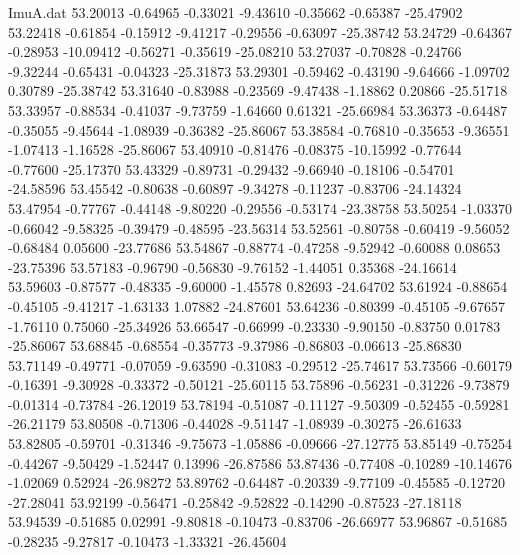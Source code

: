 \begin{filecontents}{ImuA.dat}
  53.20013   -0.64965   -0.33021   -9.43610   -0.35662   -0.65387  -25.47902
  53.22418   -0.61854   -0.15912   -9.41217   -0.29556   -0.63097  -25.38742
  53.24729   -0.64367   -0.28953  -10.09412   -0.56271   -0.35619  -25.08210
  53.27037   -0.70828   -0.24766   -9.32244   -0.65431   -0.04323  -25.31873
  53.29301   -0.59462   -0.43190   -9.64666   -1.09702    0.30789  -25.38742
  53.31640   -0.83988   -0.23569   -9.47438   -1.18862    0.20866  -25.51718
  53.33957   -0.88534   -0.41037   -9.73759   -1.64660    0.61321  -25.66984
  53.36373   -0.64487   -0.35055   -9.45644   -1.08939   -0.36382  -25.86067
  53.38584   -0.76810   -0.35653   -9.36551   -1.07413   -1.16528  -25.86067
  53.40910   -0.81476   -0.08375  -10.15992   -0.77644   -0.77600  -25.17370
  53.43329   -0.89731   -0.29432   -9.66940   -0.18106   -0.54701  -24.58596
  53.45542   -0.80638   -0.60897   -9.34278   -0.11237   -0.83706  -24.14324
  53.47954   -0.77767   -0.44148   -9.80220   -0.29556   -0.53174  -23.38758
  53.50254   -1.03370   -0.66042   -9.58325   -0.39479   -0.48595  -23.56314
  53.52561   -0.80758   -0.60419   -9.56052   -0.68484    0.05600  -23.77686
  53.54867   -0.88774   -0.47258   -9.52942   -0.60088    0.08653  -23.75396
  53.57183   -0.96790   -0.56830   -9.76152   -1.44051    0.35368  -24.16614
  53.59603   -0.87577   -0.48335   -9.60000   -1.45578    0.82693  -24.64702
  53.61924   -0.88654   -0.45105   -9.41217   -1.63133    1.07882  -24.87601
  53.64236   -0.80399   -0.45105   -9.67657   -1.76110    0.75060  -25.34926
  53.66547   -0.66999   -0.23330   -9.90150   -0.83750    0.01783  -25.86067
  53.68845   -0.68554   -0.35773   -9.37986   -0.86803   -0.06613  -25.86830
  53.71149   -0.49771   -0.07059   -9.63590   -0.31083   -0.29512  -25.74617
  53.73566   -0.60179   -0.16391   -9.30928   -0.33372   -0.50121  -25.60115
  53.75896   -0.56231   -0.31226   -9.73879   -0.01314   -0.73784  -26.12019
  53.78194   -0.51087   -0.11127   -9.50309   -0.52455   -0.59281  -26.21179
  53.80508   -0.71306   -0.44028   -9.51147   -1.08939   -0.30275  -26.61633
  53.82805   -0.59701   -0.31346   -9.75673   -1.05886   -0.09666  -27.12775
  53.85149   -0.75254   -0.44267   -9.50429   -1.52447    0.13996  -26.87586
  53.87436   -0.77408   -0.10289  -10.14676   -1.02069    0.52924  -26.98272
  53.89762   -0.64487   -0.20339   -9.77109   -0.45585   -0.12720  -27.28041
  53.92199   -0.56471   -0.25842   -9.52822   -0.14290   -0.87523  -27.18118
  53.94539   -0.51685    0.02991   -9.80818   -0.10473   -0.83706  -26.66977
  53.96867   -0.51685   -0.28235   -9.27817   -0.10473   -1.33321  -26.45604

\end{filecontents}
